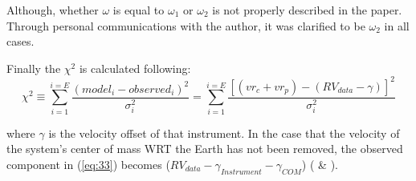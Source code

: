 \documentclass[12pt,preprint]{aastex}
\begin{document}

Although, whether $\omega$ is equal to $\omega_1$ or $\omega_2$ is not properly described in the paper.  Through personal communications with the author, it was clarified to be $\omega_2$ in all cases.  %

Finally the ${\chi}^{2} $ is calculated following:
\begin{equation}\label{eq:33}
{\chi}^{2} \equiv  \sum_{i=1}^{i=E} \frac{(model_i - observed_i)^{2}}{\sigma^{2}_i} = \sum_{i=1}^{i=E} \frac{[(vr_c+vr_p) - (RV_{data}-\gamma)]^{2}}{\sigma^{2}_i}
\end{equation}

where $\gamma $ is the velocity offset of that instrument.  In the case that the velocity of the system's center of mass WRT the Earth has not been removed, the observed component in (\ref{eq:33}) becomes ($RV_{data}-\gamma_{Instrument}-\gamma_{COM}$) (\citet{Paddock} \& \citet{Shulze-Hartung}).


\pagebreak

\clearpage
\end{document}
